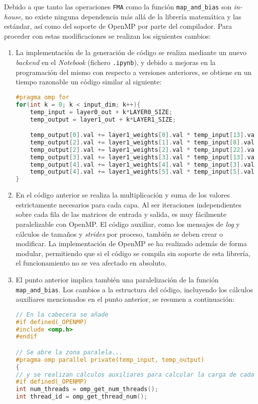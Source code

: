 Debido a que tanto las operaciones \texttt{FMA} como la función \texttt{map\_and\_bias} son \textit{in-house}, no existe ninguna dependencia más allá de la librería matemática y las estándar, así como del soporte de OpenMP por parte del compilador. Para proceder con estas modificaciones se realizan los siguientes cambios:
\begin{enumerate}
    \item La implementación de la generación de código se realiza mediante un nuevo \textit{\gls{backend}} en el \textit{Notebook} (fichero \texttt{.ipynb}), y debido a mejoras en la programación del mismo con respecto a versiones anteriores, se obtiene en un tiempo razonable un código similar al siguiente:\medskip
\begin{lstlisting}[language=C]
#pragma omp for
for(int k = 0; k < input_dim; k++){
    temp_input = layer0_out + k*LAYER0_SIZE;
    temp_output = layer1_out + k*LAYER1_SIZE;

    temp_output[0].val += layer1_weights[0].val * temp_input[13].val;
    temp_output[2].val += layer1_weights[1].val * temp_input[8].val;
    temp_output[2].val += layer1_weights[2].val * temp_input[22].val;
    temp_output[3].val += layer1_weights[3].val * temp_input[13].val;
    temp_output[4].val += layer1_weights[4].val * temp_input[3].val;
    temp_output[4].val += layer1_weights[5].val * temp_input[5].val;
}
\end{lstlisting}
    \item En el código anterior se realiza la multiplicación y suma de los valores estrictamente necesarios para cada capa. Al ser iteraciones independientes sobre cada fila de las matrices de entrada y salida, es muy fácilmente paralelizable con OpenMP. El código auxiliar, como los mensajes de \textit{log} y cálculos de tamaños y \textit{strides} por proceso, también se deben crear o modificar. La implementación de OpenMP se ha realizado además de forma modular, permitiendo que si el código se compila sin soporte de esta librería, el funcionamiento no se vea afectado en absoluto.
    \item El punto anterior implica también una paralelización de la función \texttt{map\_and\_bias}. Los cambios a la estructura del código, incluyendo los cálculos auxiliares mencionados en el punto anterior, se resumen a continuación:\medskip
\begin{lstlisting}[language=C]
// En la cabecera se añade
#if defined(_OPENMP)
#include <omp.h>
#endif

// Se abre la zona paralela...
#pragma omp parallel private(temp_input, temp_output)
{
// y se realizan cálculos auxiliares para calcular la carga de cada hilo
#if defined(_OPENMP)
int num_threads = omp_get_num_threads();
int thread_id = omp_get_thread_num();


\end{lstlisting}
\end{enumerate}
